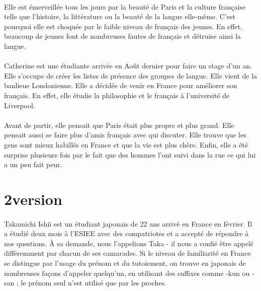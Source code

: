 \paragraph{} Elle est émerveillée tous les jours par la beauté de Paris et la
culture française telle que l'histoire, la littérature ou la beauté de la
langue elle-même. C'est pourquoi elle est choquée par le faible niveau de
français des jeunes. En effet, beaucoup de jeunes font de nombreuses fautes de
français et détruise ainsi la langue.

\paragraph{} Catherine est une étudiante arrivée en Août dernier pour faire un
stage d'un an. Elle s'occupe de créer les listes de présence des groupes de
langue. Elle vient de la banlieue Londonienne. Elle a décidée de venir en
France pour améliorer son français. En effet, elle étudie la philosophie et le
français à l'université de Liverpool.

\paragraph{} Avant de partir, elle pensait que Paris était plus propre et plus
grand. Elle pensait aussi se faire plus d'amis français avec qui discuter.
Elle trouve que les gens sont mieux habillés en France et que la vie est plus
chère. Enfin,  elle a été surprise plusieurs fois par le fait que des hommes
l'ont suivi dans la rue ce qui lui a un peu fait peur.


\section{2\ieme version}

\paragraph{} Takamichi Ishii est un étudiant japonais de 22 ans arrivé en
France en février. Il a étudié deux mois à l'ESIEE avec des compatriotes et a
accepté de répondre à nos questions. À sa demande, nous l'appelions Taka - il
nous a confié être appelé différemment par chacun de ses camarades. Si le
niveau de familiarité en France se distingue par l'usage du prénom et du
tutoiement, on trouve en japonais de nombreuses façons d'appeler quelqu'un, en
utilisant des suffixes comme -kun ou -san ; le prénom seul n'est utilisé que
par les proches.

